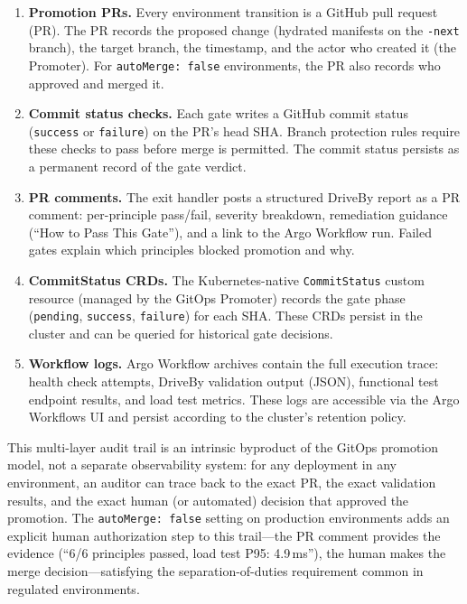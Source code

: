 \begin{enumerate}
    \item \textbf{Promotion PRs.} Every environment transition is a GitHub pull request (PR). The PR records the proposed change (hydrated manifests on the \texttt{-next} branch), the target branch, the timestamp, and the actor who created it (the Promoter). For \texttt{autoMerge: false} environments, the PR also records who approved and merged it.
    \item \textbf{Commit status checks.} Each gate writes a GitHub commit status (\texttt{success} or \texttt{failure}) on the PR's head SHA. Branch protection rules require these checks to pass before merge is permitted. The commit status persists as a permanent record of the gate verdict.
    \item \textbf{PR comments.} The exit handler posts a structured DriveBy report as a PR comment: per-principle pass/fail, severity breakdown, remediation guidance (``How to Pass This Gate''), and a link to the Argo Workflow run. Failed gates explain which principles blocked promotion and why.
    \item \textbf{CommitStatus CRDs.} The Kubernetes-native \texttt{CommitStatus} custom resource (managed by the GitOps Promoter) records the gate phase (\texttt{pending}, \texttt{success}, \texttt{failure}) for each SHA. These CRDs persist in the cluster and can be queried for historical gate decisions.
    \item \textbf{Workflow logs.} Argo Workflow archives contain the full execution trace: health check attempts, DriveBy validation output (JSON), functional test endpoint results, and load test metrics. These logs are accessible via the Argo Workflows UI and persist according to the cluster's retention policy.
\end{enumerate}

This multi-layer audit trail is an intrinsic byproduct of the GitOps promotion model, not a separate observability system: for any deployment in any environment, an auditor can trace back to the exact PR, the exact validation results, and the exact human (or automated) decision that approved the promotion. The \texttt{autoMerge: false} setting on production environments adds an explicit human authorization step to this trail---the PR comment provides the evidence (``6/6 principles passed, load test P95: 4.9\,ms''), the human makes the merge decision---satisfying the separation-of-duties requirement common in regulated environments.

